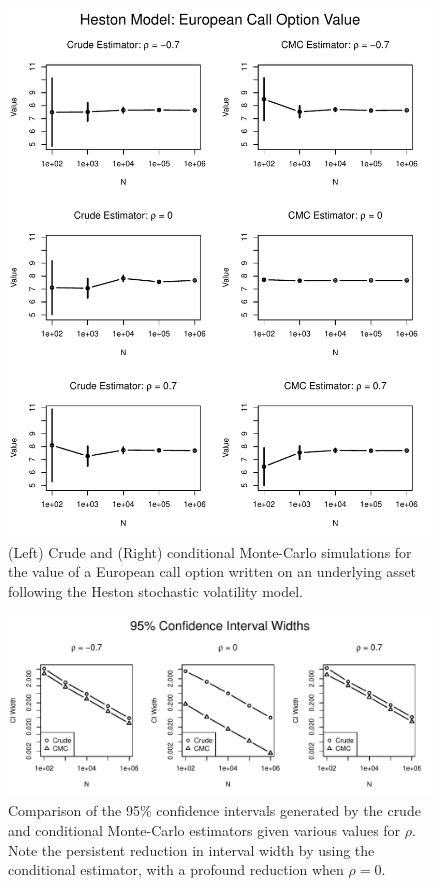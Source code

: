 \documentclass[12pt]{article}
\begin{document}
\begin{figure}[H]
	\centering
 	\includegraphics[scale=1]{../plots/q4/heston_call_est.pdf}
\caption{(Left) Crude and (Right) conditional Monte-Carlo simulations for the value of a European call option written on an underlying asset following the Heston stochastic volatility model.}
\label{fig:heston_call_est}
\end{figure}

\begin{figure}[H]
	\centering
 	\includegraphics[scale=1]{../plots/q4/heston_call_CI_width.pdf}
\caption{Comparison of the 95\% confidence intervals generated by the crude and conditional Monte-Carlo estimators given various values for $\rho$. Note the persistent reduction in interval width by using the conditional estimator, with a profound reduction when $\rho = 0$.}
\label{fig:heston_call_CI}
\end{figure}
\end{document}
